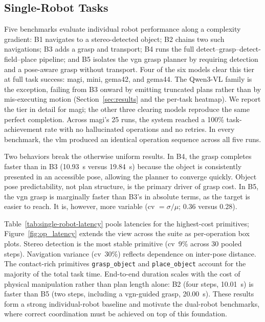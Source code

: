 \documentclass[
     12pt,
     a4paper,
     BCOR=10mm,
     DIV=14,
     listof=totoc,
     bibliography=totoc,
     parskip,
     twoside,
     headsepline
     ]{scrreprt}
\begin{document}
\subsection{Single-Robot Tasks}
Five benchmarks evaluate individual robot performance along a complexity gradient: B1 navigates to a stereo-detected object; B2 chains two such navigations; B3 adds a grasp and transport; B4 runs the full detect--grasp--detect-field--place pipeline; and B5 isolates the \gls{vgn} grasp planner by requiring detection and a pose-aware grasp without transport. Four of the six models clear this tier at full task success: \gls{magi}, \gls{mini}, \gls{gema42}, and \gls{gema44}. The Qwen3-VL family is the exception, failing from B3 onward by emitting truncated plans rather than by mis-executing motion (Section~\ref{sec:results} and the per-task heatmap). We report the tier in detail for \gls{magi}; the other three clearing models reproduce the same perfect completion. Across \gls{magi}'s 25 runs, the system reached a 100\% task-achievement rate with no hallucinated operations and no retries. In every benchmark, the \gls{vlm} produced an identical operation sequence across all five runs.

Two behaviors break the otherwise uniform results. In B4, the grasp completes faster than in B3 (10.93~s versus 19.84~s) because the object is consistently presented in an accessible pose, allowing the planner to converge quickly. Object pose predictability, not plan structure, is the primary driver of grasp cost. In B5, the \gls{vgn} grasp is marginally faster than B3's in absolute terms, as the target is easier to reach. It is, however, more variable (\gls{cv} $=\sigma/\mu$; 0.36 versus 0.28).

Table~\ref{tab:single-robot-latency} pools latencies for the highest-cost primitives; Figure~\ref{fig:op_latency} extends the view across the suite as per-operation box plots. Stereo detection is the most stable primitive (\gls{cv}~9\% across 30 pooled steps). Navigation variance (\gls{cv}~30\%) reflects dependence on inter-pose distance. The contact-rich primitives \texttt{grasp\_object} and \texttt{place\_object} account for the majority of the total task time. End-to-end duration scales with the cost of physical manipulation rather than plan length alone: B2 (four steps, 10.01~s) is faster than B5 (two steps, including a \gls{vgn}-guided grasp, 20.00~s). These results form a strong individual-robot baseline and motivate the dual-robot benchmarks, where correct coordination must be achieved on top of this foundation.
\end{document}
